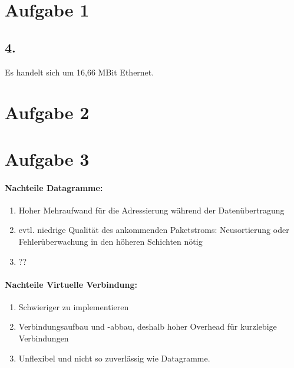 \section{Aufgabe 1}

\subsection{4.}
Es handelt sich um 16,66 MBit Ethernet.
\[  \]


\section{Aufgabe 2}

\section{Aufgabe 3}

\paragraph{Nachteile Datagramme:}
\begin{enumerate}
\item Hoher Mehraufwand für die Adressierung während der Datenübertragung
\item evtl. niedrige Qualität des ankommenden Paketstroms:  Neusortierung oder Fehlerüberwachung in den höheren Schichten nötig
\item ??
\end{enumerate}

\paragraph{Nachteile Virtuelle Verbindung:}
\begin{enumerate}
\item Schwieriger zu implementieren
\item Verbindungsaufbau und -abbau, deshalb hoher Overhead für kurzlebige Verbindungen
\item Unflexibel und nicht so zuverlässig wie Datagramme.
\end{enumerate}